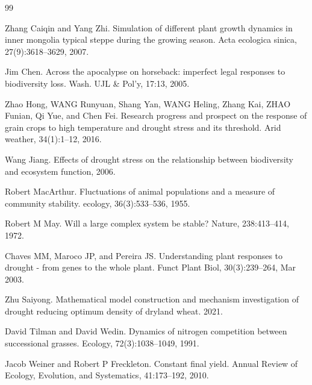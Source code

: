 \documentclass[11pt,a4paper]{ctexart}
\begin{document}
\begin{thebibliography}{99}

 Zhang Caiqin and Yang Zhi. Simulation of different plant growth dynamics in inner mongolia typical steppe during the growing season. Acta ecologica sinica, 27(9):3618--3629, 2007.

 Jim Chen. Across the apocalypse on horseback: imperfect legal responses to biodiversity loss. Wash. UJL \& Pol'y, 17:13, 2005.

 Zhao Hong, WANG Runyuan, Shang Yan, WANG Heling, Zhang Kai, ZHAO Funian, Qi Yue, and Chen Fei. Research progress and prospect on the response of grain crops to high temperature and drought stress and its threshold. Arid weather, 34(1):1--12, 2016.

 Wang Jiang. Effects of drought stress on the relationship between biodiversity and ecosystem function, 2006.

 Robert MacArthur. Fluctuations of animal populations and a measure of community stability. ecology, 36(3):533--536, 1955.

 Robert M May. Will a large complex system be stable? Nature, 238:413--414, 1972.

 Chaves MM, Maroco JP, and Pereira JS. Understanding plant responses to drought - from genes to the whole plant. Funct Plant Biol, 30(3):239--264, Mar 2003.

 Zhu Saiyong. Mathematical model construction and mechanism investigation of drought reducing optimum density of dryland wheat. 2021.

 David Tilman and David Wedin. Dynamics of nitrogen competition between successional grasses. Ecology, 72(3):1038--1049, 1991.

 Jacob Weiner and Robert P Freckleton. Constant final yield. Annual Review of Ecology, Evolution, and Systematics, 41:173--192, 2010.

\end{thebibliography}
\end{document}
